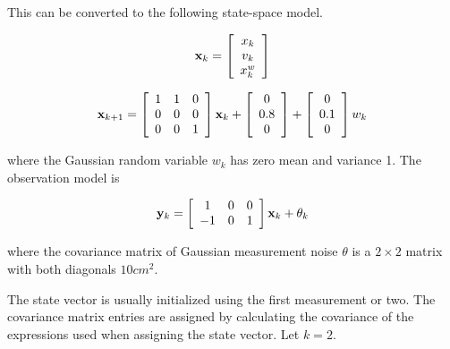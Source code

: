 This can be converted to the following state-space \gls{model}.

\begin{equation}
  \mathbf{x}_k = \left[
  \begin{array}{c}
    x_k \\
    v_k \\
    x_k^w
  \end{array} \right]
\end{equation}

\begin{equation}
  \mathbf{x}_{k+1} = \left[
  \begin{array}{ccc}
    1 & 1 & 0 \\
    0 & 0 & 0 \\
    0 & 0 & 1
  \end{array} \right] \mathbf{x}_k + \left[
  \begin{array}{c}
    0 \\
    0.8 \\
    0
  \end{array} \right] + \left[
  \begin{array}{c}
    0 \\
    0.1 \\
    0
  \end{array} \right] w_k
\end{equation}

where the Gaussian random variable $w_k$ has zero mean and variance 1. The
observation \gls{model} is

\begin{equation}
  \mathbf{y}_k = \left[
  \begin{array}{ccc}
    1 & 0 & 0 \\
    -1 & 0 & 1
  \end{array} \right] \mathbf{x}_k + \theta_k
\end{equation}

where the covariance matrix of Gaussian measurement noise $\theta$ is a
$2 \times 2$ matrix with both diagonals $10 cm^2$.

The state vector is usually initialized using the first measurement or two. The
covariance matrix entries are assigned by calculating the covariance of the
expressions used when assigning the state vector. Let $k = 2$.

